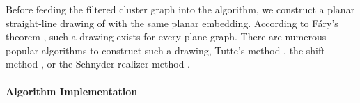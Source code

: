 Before feeding the filtered cluster graph \clustergraph{} into the algorithm, we construct a planar straight-line drawing \clusterdrawing{} of \clustergraph{} with the same planar embedding.
According to Fáry's theorem \cite{fary1948straight} \cite{wagner1936bemerkungen} \cite{stein1951convex}, such a drawing exists for every plane graph.
There are numerous popular algorithms to construct such a drawing, \eg{} Tutte's method \cite{tutte1963draw}, the shift method \cite{fraysseix1990draw}, or the Schnyder realizer method \cite{schnyder1990embedding}.



\clearpage
\paragraph{Algorithm Implementation}

